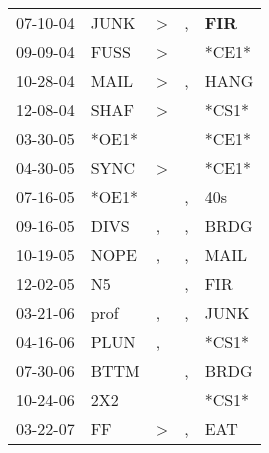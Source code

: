 \begin{supertabular}{p{0.07\textwidth}p{0.06\textwidth}p{0.02\textwidth}p{0.02\textwidth}p{0.06\textwidth}}
          07-10-04\textsuperscript{} &           JUNK\textsuperscript{} &     \textgreater &             , &   \textbf{FIR\textsuperscript{}} \\
          09-09-04\textsuperscript{} &           FUSS\textsuperscript{} &     \textgreater &               &                            *CE1* \\
          10-28-04\textsuperscript{} &           MAIL\textsuperscript{} &     \textgreater &             , &           HANG\textsuperscript{} \\
          12-08-04\textsuperscript{} &           SHAF\textsuperscript{} &     \textgreater &               &                            *CS1* \\
          03-30-05\textsuperscript{} &                            *OE1* &                  &               &                            *CE1* \\
          04-30-05\textsuperscript{} &           SYNC\textsuperscript{} &     \textgreater &               &                            *CE1* \\
          07-16-05\textsuperscript{} &                            *OE1* &                  &             , &            40s\textsuperscript{} \\
          09-16-05\textsuperscript{} &           DIVS\textsuperscript{} &                , &             , &           BRDG\textsuperscript{} \\
          10-19-05\textsuperscript{} &           NOPE\textsuperscript{} &                , &             , &           MAIL\textsuperscript{} \\
          12-02-05\textsuperscript{} &             N5\textsuperscript{} &                  &             , &            FIR\textsuperscript{} \\
          03-21-06\textsuperscript{} &           prof\textsuperscript{} &                , &             , &           JUNK\textsuperscript{} \\
          04-16-06\textsuperscript{} &           PLUN\textsuperscript{} &                , &               &                            *CS1* \\
          07-30-06\textsuperscript{} &           BTTM\textsuperscript{} &                  &             , &           BRDG\textsuperscript{} \\
          10-24-06\textsuperscript{} &            2X2\textsuperscript{} &                  &               &                            *CS1* \\
          03-22-07\textsuperscript{} &             FF\textsuperscript{} &     \textgreater &             , &            EAT\textsuperscript{} \\

\end{supertabular}
